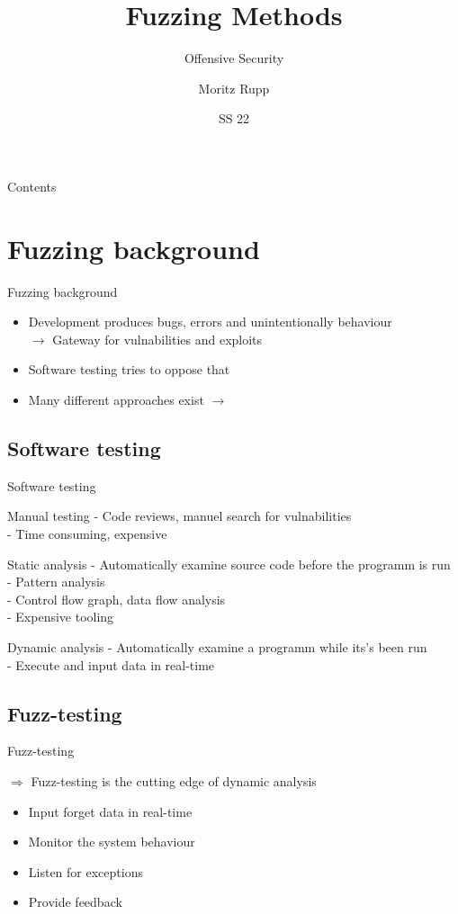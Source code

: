 \documentclass{beamer}
\title[Offensive Security]{Fuzzing Methods}
\subtitle{Offensive Security}
\author{Moritz Rupp}
\institute[MR]{Hochschule Albstadt-Sigmaringen}
\date{SS 22}
\begin{document}
\begin{frame}
 \titlepage
\end{frame}
\begin{frame}{Contents}
 \tableofcontents
\end{frame}
\section{Fuzzing background}
\begin{frame}{Fuzzing background}
\begin{itemize}
 \item Development produces bugs, errors and unintentionally behaviour\\
 $\rightarrow$ Gateway for vulnabilities and exploits
 \item Software testing tries to oppose that
 \item Many different approaches exist $\rightarrow$
\end{itemize}
\end{frame}
\subsection{Software testing}
\begin{frame}{Software testing}
 \begin{block}{Manual testing}
  - Code reviews, manuel search for vulnabilities\\
  - Time consuming, expensive
 \end{block}
\begin{block}{Static analysis}
- Automatically examine source code before the programm is run\\
- Pattern analysis \\
- Control flow graph, data flow analysis\\
- Expensive tooling
\end{block}
\begin{block}{Dynamic analysis}
- Automatically examine a programm while its's been run\\
- Execute and input data in real-time\\
\end{block}
\end{frame}
\subsection{Fuzz-testing}
\begin{frame}{Fuzz-testing}

  $\Rightarrow$ Fuzz-testing is the cutting edge of dynamic analysis
  
  \begin{itemize}
   \item Input forget data in real-time
   \item Monitor the system behaviour
   \item Listen for exceptions
   \item Provide feedback
  \end{itemize}

\end{frame}
\end{document}
